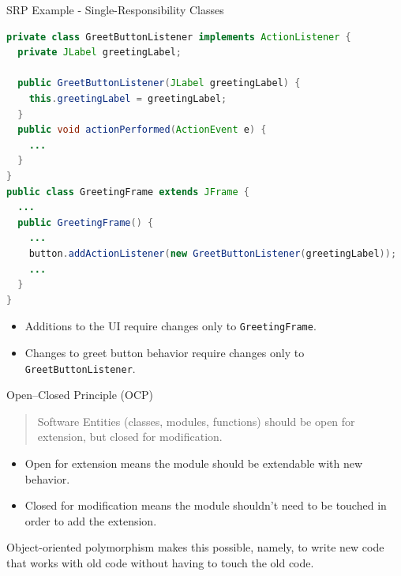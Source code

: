 \documentclass{beamer}
\begin{document}
\begin{frame}[fragile]{SRP Example - Single-Responsibility Classes}
\vspace{-.1in}
\begin{lstlisting}[language=Java]
private class GreetButtonListener implements ActionListener {
  private JLabel greetingLabel;
  
  public GreetButtonListener(JLabel greetingLabel) {
    this.greetingLabel = greetingLabel;
  }
  public void actionPerformed(ActionEvent e) {
    ...
  }
}
public class GreetingFrame extends JFrame {
  ...
  public GreetingFrame() {
    ...
    button.addActionListener(new GreetButtonListener(greetingLabel)); 
    ...
  }
}
\end{lstlisting}
\vspace{-.1in}
\begin{itemize}
\item Additions to the UI require changes only to {\tt GreetingFrame}.
\item Changes to greet button behavior require changes only to {\tt GreetButtonListener}.
\end{itemize}


\end{frame}


\begin{frame}[fragile]{Open--Closed Principle (OCP)}

\begin{quote}
Software Entities (classes, modules, functions) should be open for extension, but closed for modification.
\end{quote}

\begin{itemize}
\item Open for extension means the module should be extendable with new behavior.
\item Closed for modification means the module shouldn't need to be touched in order to add the extension.
\end{itemize}
Object-oriented polymorphism makes this possible, namely, to write new code that works with old code without having to touch the old code.


\end{frame}
\end{document}
